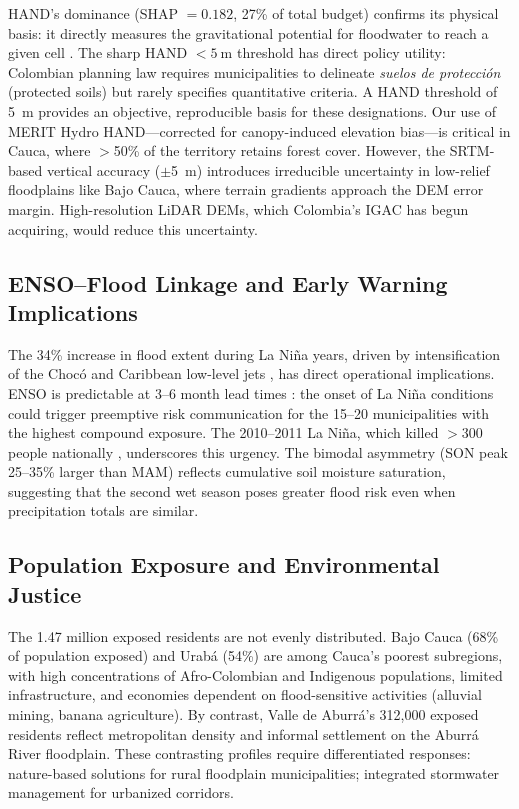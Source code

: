 \documentclass{article}
\begin{document}
HAND's dominance (SHAP $= 0.182$, 27\% of total budget) confirms its physical basis: it directly measures the gravitational potential for floodwater to reach a given cell \citep{Renno2008, Nobre2011}. The sharp HAND $< \SI{5}{\metre}$ threshold has direct policy utility: Colombian planning law requires municipalities to delineate \textit{suelos de protecci\'on} (protected soils) but rarely specifies quantitative criteria. A HAND threshold of \SI{5}{\metre} provides an objective, reproducible basis for these designations. Our use of MERIT Hydro HAND---corrected for canopy-induced elevation bias---is critical in Cauca, where $>$50\% of the territory retains forest cover. However, the SRTM-based vertical accuracy ($\pm$\SI{5}{\metre}) introduces irreducible uncertainty in low-relief floodplains like Bajo Cauca, where terrain gradients approach the DEM error margin. High-resolution LiDAR DEMs, which Colombia's IGAC has begun acquiring, would reduce this uncertainty.

\subsection{ENSO--Flood Linkage and Early Warning Implications}

The 34\% increase in flood extent during La Ni\~na years, driven by intensification of the Choc\'o and Caribbean low-level jets \citep{Poveda2001, Salas2023}, has direct operational implications. ENSO is predictable at 3--6 month lead times \citep{Tippett2012}: the onset of La Ni\~na conditions could trigger preemptive risk communication for the 15--20 municipalities with the highest compound exposure. The 2010--2011 La Ni\~na, which killed $>$300 people nationally \citep{Hoyos2013}, underscores this urgency. The bimodal asymmetry (SON peak 25--35\% larger than MAM) reflects cumulative soil moisture saturation, suggesting that the second wet season poses greater flood risk even when precipitation totals are similar.

\subsection{Population Exposure and Environmental Justice}

The 1.47 million exposed residents are not evenly distributed. Bajo Cauca (68\% of population exposed) and Urab\'a (54\%) are among Cauca's poorest subregions, with high concentrations of Afro-Colombian and Indigenous populations, limited infrastructure, and economies dependent on flood-sensitive activities (alluvial mining, banana agriculture). By contrast, Valle de Aburr\'a's 312,000 exposed residents reflect metropolitan density and informal settlement on the Aburr\'a River floodplain. These contrasting profiles require differentiated responses: nature-based solutions for rural floodplain municipalities; integrated stormwater management for urbanized corridors.
\end{document}
